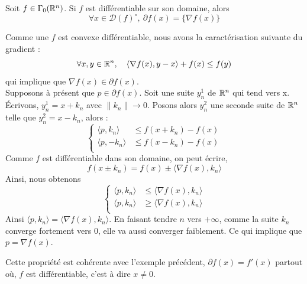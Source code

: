 \documentclass[a4paper,12pt]{article}
\begin{document}
\begin{propriete}
Soit $f\in\Gamma_0(\mathbb{R}^n)$. Si $f$ est différentiable sur son domaine, alors 
$$
\forall x\in \mathcal{D}(f)^{\circ},\ \partial f(x) = \{\nabla f(x)\}
$$
\end{propriete}
\begin{preuve}
Comme une $f$ est convexe différentiable, nous avons la caractérisation suivante du gradient : 
$$
\forall x,y\in\mathbb{R}^n,\quad \langle \nabla f (x) ,y-x\rangle +f(x) \leq f(y)
$$
qui implique que $\nabla f(x) \in\partial f(x)$.\\
Supposons à présent que $p\in\partial f(x)$. Soit une suite $y_n^1$ de $\mathbb{R}^n$ qui tend vers x. Écrivons, $y_n^1=x+k_n$ avec $\|k_n\|\rightarrow 0$. Posons alors $y_n^2$ une seconde suite de $\mathbb{R}^n$ telle que $y_n^2= x-k_n$, alors : 
$$
\left\{
\begin{array}{cc}
\langle p, k_n\rangle &\leq f(x +k_n) - f(x) \\
\langle p,-k_n\rangle & \leq f(x-k_n)-f(x) \\
\end{array}
\right.
$$
Comme $f$ est différentiable dans son domaine, on peut écrire, 
$$
f(x\pm k_n)=f(x) \pm \langle \nabla f(x), k_n\rangle
$$
Ainsi, nous obtenons
$$
\left\{
\begin{array}{cc}
\langle p, k_n\rangle &\leq \langle \nabla f(x), k_n\rangle \\
\langle p, k_n\rangle &\geq \langle \nabla f(x), k_n\rangle \\
\end{array}
\right.
$$
Ainsi $\langle p,k_n \rangle = \langle \nabla f(x),k_n\rangle$. En faisant tendre $n$ vers $+\infty$, comme la suite $k_n$ converge fortement vers $0$, elle va aussi converger faiblement. Ce qui implique que $p=\nabla f(x)$. 
\end{preuve}
Cette propriété est cohérente avec l'exemple précédent, $\partial f(x) =f'(x)$ partout où, $f$ est différentiable, c'est à dire $x\neq 0$. 
\end{document}
